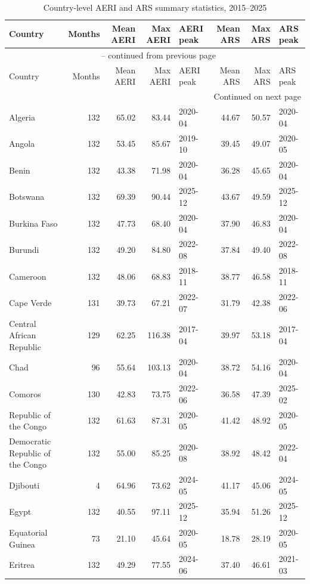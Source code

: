 \setlength{\tabcolsep}{3pt}\begin{longtable}{lrrrlrrl}
\caption{Country-level AERI and ARS summary statistics, 2015--2025}\label{tab:all_country_aeri_ars}\\
\toprule
Country & Months & Mean AERI & Max AERI & AERI peak & Mean ARS & Max ARS & ARS peak\\
\midrule
\endfirsthead
\multicolumn{8}{c}{\tablename\ \thetable{} -- continued from previous page}\\
\toprule
Country & Months & Mean AERI & Max AERI & AERI peak & Mean ARS & Max ARS & ARS peak\\
\midrule
\endhead
\midrule \multicolumn{8}{r}{Continued on next page}\\ \endfoot
\bottomrule \endlastfoot
Algeria & 132 & 65.02 & 83.44 & 2020-04 & 44.67 & 50.57 & 2020-04\\
Angola & 132 & 53.45 & 85.67 & 2019-10 & 39.45 & 49.07 & 2020-05\\
Benin & 132 & 43.38 & 71.98 & 2020-04 & 36.28 & 45.65 & 2020-04\\
Botswana & 132 & 69.39 & 90.44 & 2025-12 & 43.67 & 49.59 & 2025-12\\
Burkina Faso & 132 & 47.73 & 68.40 & 2020-04 & 37.90 & 46.83 & 2020-04\\
Burundi & 132 & 49.20 & 84.80 & 2022-08 & 37.84 & 49.40 & 2022-08\\
Cameroon & 132 & 48.06 & 68.83 & 2018-11 & 38.77 & 46.58 & 2018-11\\
Cape Verde & 131 & 39.73 & 67.21 & 2022-07 & 31.79 & 42.38 & 2022-06\\
Central African Republic & 129 & 62.25 & 116.38 & 2017-04 & 39.97 & 53.18 & 2017-04\\
Chad & 96 & 55.64 & 103.13 & 2020-04 & 38.72 & 54.16 & 2020-04\\
Comoros & 130 & 42.83 & 73.75 & 2022-06 & 36.58 & 47.39 & 2025-02\\
Republic of the Congo & 132 & 61.63 & 87.31 & 2020-05 & 41.42 & 48.92 & 2020-05\\
Democratic Republic of the Congo & 132 & 55.00 & 85.25 & 2020-08 & 38.92 & 48.42 & 2022-04\\
Djibouti & 4 & 64.96 & 73.62 & 2024-05 & 41.17 & 45.06 & 2024-05\\
Egypt & 132 & 40.55 & 97.11 & 2025-12 & 35.94 & 51.26 & 2025-12\\
Equatorial Guinea & 73 & 21.10 & 45.64 & 2020-05 & 18.78 & 28.19 & 2020-05\\
Eritrea & 132 & 49.29 & 77.55 & 2024-06 & 37.40 & 46.61 & 2021-03\\

\end{longtable}
